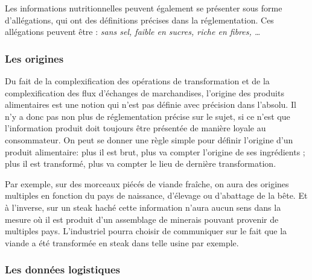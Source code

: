                 Les informations nutritionnelles peuvent également se présenter sous forme d'allégations, qui ont des définitions précises dans la réglementation. Ces allégations peuvent être : \emph{sans sel, faible en sucres, riche en fibres, \dots}

                \subsubsection{Les origines}

                Du fait de la complexification des opérations de transformation et de la complexification des flux d'échanges de marchandises, l'origine des produits alimentaires est une notion qui n'est pas définie avec précision dans l'absolu.
                Il n'y a donc pas non plus de réglementation précise sur le sujet, si ce n'est que l'information produit doit toujours être présentée de manière loyale au consommateur.
                On peut se donner une règle simple pour définir l'origine d'un produit alimentaire: plus il est brut, plus va compter l'origine de ses ingrédients ; plus il est transformé, plus va compter le lieu de dernière transformation.

                Par exemple, sur des morceaux piécés de viande fraîche, on aura des origines multiples en fonction du pays de naissance, d'élevage ou d'abattage de la bête.
                Et à l'inverse, sur un steak haché cette information n'aura aucun sens dans la mesure où il est produit d'un assemblage de \og minerais \fg pouvant provenir de multiples pays.
                L'industriel pourra choisir de communiquer sur le fait que la viande a été transformée en steak dans telle usine par exemple.

                \subsubsection{Les données logistiques} 

